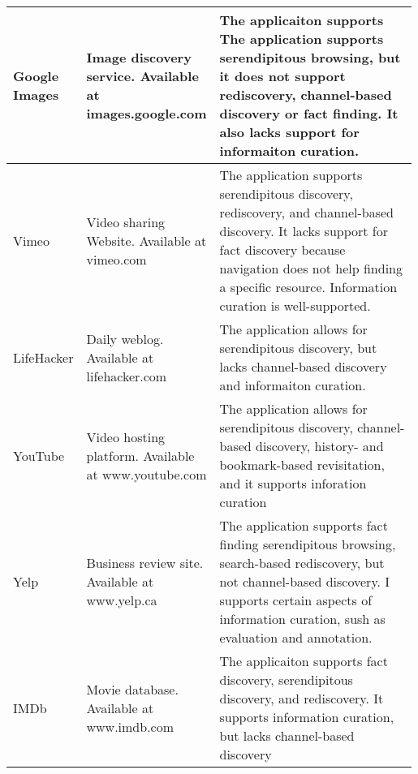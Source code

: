 \documentclass{casconpaper}
\begin{document}
{\begin{table*}[htbp]
\begin{tabular}{|p{0.11\linewidth}| p{0.22\linewidth}| p{0.66\linewidth}|}
\hline
Google Images   & \raggedright Image discovery service. Available at images.google.com                      & The applicaiton supports The application supports serendipitous browsing, but it does not support rediscovery, channel-based discovery or fact finding. It also lacks support for informaiton curation.                                                                                                         \\
\hline
Vimeo           & \raggedright Video sharing Website. Available at vimeo.com                                & The application supports serendipitous discovery, rediscovery, and channel-based discovery. It lacks support for fact discovery because navigation does not help finding a specific resource. Information curation is well-supported.                                                                           \\
\hline
LifeHacker      & \raggedright Daily weblog. Available at lifehacker.com                                    & The application allows for serendipitous discovery, but lacks channel-based discovery and informaiton curation.                                                                                                                                                                                                 \\
\hline
YouTube         & \raggedright Video hosting platform. Available at www.youtube.com                         & The application allows for serendipitous discovery, channel-based discovery, history- and bookmark-based revisitation, and it supports inforation curation                                                                                                                                                      \\
\hline
Yelp            & \raggedright Business review site. Available at www.yelp.ca                               & The application supports fact finding serendipitous browsing, search-based rediscovery, but not channel-based discovery. I supports certain aspects of information curation, sush as evaluation and annotation.                                                                                                 \\
\hline
IMDb            & \raggedright Movie database. Available at www.imdb.com                                    & The applicaiton supports fact discovery, serendipitous discovery, and rediscovery. It supports information curation, but lacks channel-based discovery                                                                                                                                                          \\

\end{tabular}
\end{table*}}
\end{document}
